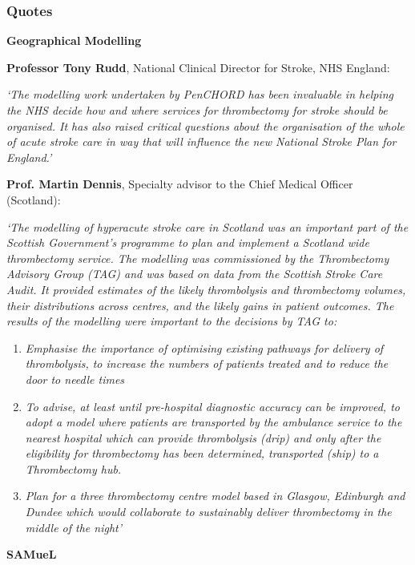 \subsubsection{Quotes}

\textbf{Geographical Modelling}

\textbf{Professor Tony Rudd}, National Clinical Director for Stroke, NHS England:

\textit{‘The modelling work undertaken by PenCHORD has been invaluable in helping the NHS decide how and where services for thrombectomy for stroke should be organised. It has also raised critical questions about the organisation of the whole of acute stroke care in way that will influence the new National Stroke Plan for England.’}

\textbf{Prof. Martin Dennis}, Specialty advisor to the Chief Medical Officer (Scotland):

\textit{`The modelling of hyperacute stroke care in Scotland was an important part of the Scottish Government’s programme to plan and implement a Scotland wide thrombectomy service. The modelling was commissioned by the Thrombectomy Advisory Group (TAG) and was based on data from the Scottish Stroke Care Audit. It provided estimates of the likely thrombolysis and thrombectomy volumes, their distributions across centres, and the likely gains in patient outcomes. The results of the modelling were important to the decisions by TAG to:}

\begin{enumerate}
    \item \textit{Emphasise the importance of optimising existing pathways for delivery of thrombolysis, to increase the numbers of patients treated and to reduce the door to needle times}

    \item {\textit{To advise, at least until pre-hospital diagnostic accuracy can be improved, to adopt a model where patients are transported by the ambulance service to the nearest hospital which can provide thrombolysis (drip) and only after the eligibility for thrombectomy has been determined, transported (ship) to a Thrombectomy hub.}}

    \item{\textit{Plan for a three thrombectomy centre model based in Glasgow, Edinburgh and Dundee which would collaborate to sustainably deliver thrombectomy in the middle of the night’}}
\end{enumerate}
 
\textbf{SAMueL}

